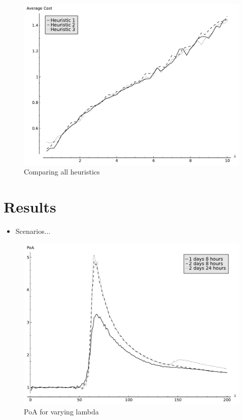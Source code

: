 \documentclass[12pt]{article}
\begin{document}
\begin{figure}[!hbtp]
    \begin{center}
        \includegraphics[width=.8\textwidth]{Images/Exit0.pdf}
    \end{center}
    \caption{Comparing all heuristics}\label{allheuristics}
\end{figure}

\section{Results}\label{results}

\begin{itemize}
\item Scenarios...
\end{itemize}

\begin{figure}[!hbtp]
    \begin{center}
        \includegraphics[width=.8\textwidth]{Images/Ana_Lambda.pdf}
    \end{center}
    \caption{PoA for varying lambda}\label{ana_lambda}
\end{figure}
\end{document}
